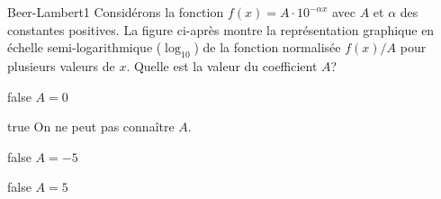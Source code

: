 \documentclass[11pt]{article}
\begin{document}
        \begin{question}{27}{Beer-Lambert}{1}{}
            Considérons la fonction $f(x) = A\cdot 10^{-\alpha x}$ avec $A$ et $\alpha$ des constantes positives. La figure ci-après montre la représentation graphique en échelle semi-logarithmique ($\log_{10}$) de la fonction normalisée $f(x)/A$ pour plusieurs valeurs de $x$. Quelle est la valeur du coefficient $A$?
            \begin{figure}
             \end{figure}
        \end{question}
        \begin{reponses}
            \item[false] $A = 0$
		    \item[true] On ne peut pas connaître $A$.
		    \item[false] $A = \num{-5}$
		    \item[false] $A = \num{5}$
		    \end{reponses}
        
\end{document}
